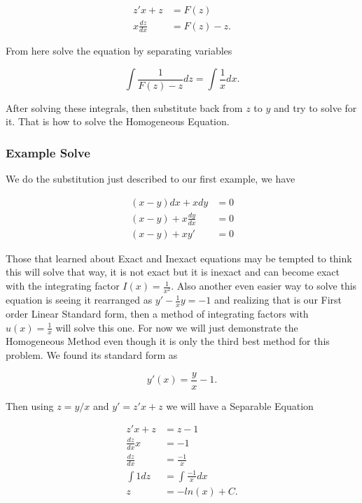 \documentclass[12pt]{article}
\begin{document}
\begin{align*}
    z'x+z &= F(z) \\
    x\frac{dz}{dx} &= F(z)-z.
\end{align*}

From here solve the equation by separating variables

\begin{equation*}
    \int \frac{1}{F(z)-z}dz= \int \frac{1}{x}dx.
\end{equation*}

After solving these integrals, then substitute back from $z$ to $y$ and try to solve for it. That is how to solve the Homogeneous Equation.

\subsubsection{Example Solve}

We do the substitution just described to our first example, we have 

\begin{align*}
    (x-y)dx+xdy&=0 \\
    (x-y)+x\frac{dy}{dx}&=0 \\
    (x-y)+xy'&=0
\end{align*}

Those that learned about Exact and Inexact equations may be tempted to think this will solve that way, it is not exact but it is inexact and can become exact with the integrating factor $I(x)=\frac{1}{x^2}$. Also another even easier way to solve this equation is seeing it rearranged as $y'-\frac{1}{x}y=-1$ and realizing that is our First order Linear Standard form, then a method of integrating factors with $u(x)=\frac{1}{x}$ will solve this one. For now we will just demonstrate the Homogeneous Method even though it is only the third best method for this problem. We found its standard form as

\begin{equation*}
    y'(x) = \frac{y}{x}-1.
\end{equation*}

Then using $z=y/x$ and $y'=z'x+z$ we will have a Separable Equation

\begin{align*}
    z'x+z &= z-1 \\
    \frac{dz}{dx}x &= -1 \\
    \frac{dz}{dx} &= \frac{-1}{x} \\
    \int 1 dz &= \int \frac{-1}{x}dx \\
    z &= -ln(x) + C.
\end{align*}
\end{document}
